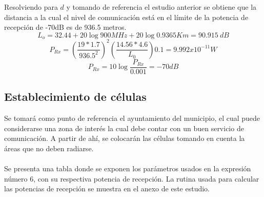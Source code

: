 \documentclass[11pt,letterpaper]{article}
\begin{document}
\newpage
Resolviendo para $d$ y tomando de referencia el estudio anterior se obtiene que la distancia 
a la cual el nivel de comunicación está en el límite de la potencia de recepción de -70dB es 
de 936.5 metros.
\begin{equation}
    L_o=32.44+20\log{900MHz}+20\log{0.9365 Km}=90.915 \ dB
\end{equation}
\begin{equation}
    P_{Rx}=(\frac{19*1.7}{936.5^2})^2 (\frac{14.56*4.6}{L_0}) 0.1=9.992x10^{-11} W
\end{equation}
\begin{equation}
    P_{Rx}=10\log{\frac{P_{Rx}}{0.001}}=-70dB
\end{equation}

\subsection{Establecimiento de células}
Se tomará como punto de referencia el ayuntamiento del municipio, el cual puede considerarse 
una zona de interés la cual debe contar con un buen servicio de comunicación. A partir de 
ahí, se colocarán las células tomando en cuenta la áreas que no deben radiarse.
\\ \\ 
Se presenta una tabla donde se exponen los parámetros usados en la expresión número 6, con 
su respectiva potencia de recepción. La rutina usada para calcular las potencias de 
recepción se muestra en el anexo de este estudio. 
\end{document}
